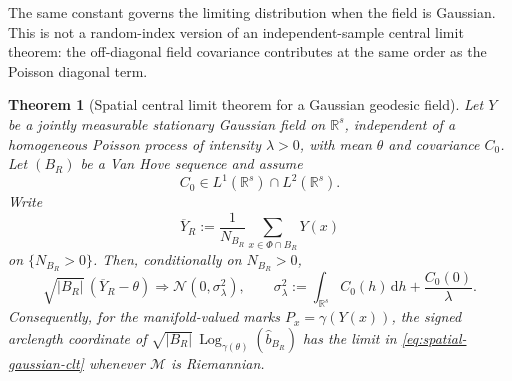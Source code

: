 \documentclass[11pt,a4paper]{article}
\newtheorem{theorem}{Theorem}[section]
\theoremstyle{remark}
\newcommand{\R}{\mathbb R}
\newcommand{\M}{\mathcal M}
\newcommand{\Log}{\operatorname{Log}}
\begin{document}
The same constant governs the limiting distribution when the field is Gaussian.  This is not a random-index version of an independent-sample central limit theorem: the off-diagonal field covariance contributes at the same order as the Poisson diagonal term.

\begin{theorem}[Spatial central limit theorem for a Gaussian geodesic field]
\label{thm:spatial-gaussian-clt}
Let \(Y\) be a jointly measurable stationary Gaussian field on \(\R^s\), independent of a homogeneous Poisson process of intensity \(\lambda>0\), with mean \(\theta\) and covariance \(C_0\).  Let \((B_R)\) be a Van Hove sequence and assume
\begin{equation}
\label{eq:clt-cov-assumption}
 C_0\in L^1(\R^s)\cap L^2(\R^s).
\end{equation}
Write
\[
 \overline Y_R:=\frac1{N_{B_R}}\sum_{x\in\Phi\cap B_R}Y(x)
\]
on \(\{N_{B_R}>0\}\).  Then, conditionally on \(N_{B_R}>0\),
\begin{equation}
\label{eq:spatial-gaussian-clt}
 \sqrt{|B_R|}\,(\overline Y_R-\theta)
 \Rightarrow
 \mathcal N(0,\sigma_\lambda^2),
 \qquad
 \sigma_\lambda^2:=\int_{\R^s}C_0(h)\,\mathrm dh+\frac{C_0(0)}{\lambda}.
\end{equation}
Consequently, for the manifold-valued marks \(P_x=\gamma(Y(x))\), the signed arclength coordinate of
\(\sqrt{|B_R|}\,\Log_{\gamma(\theta)}(\widehat b_{B_R})\) has the limit in \eqref{eq:spatial-gaussian-clt} whenever \(\M\) is Riemannian.
\end{theorem}
\end{document}
